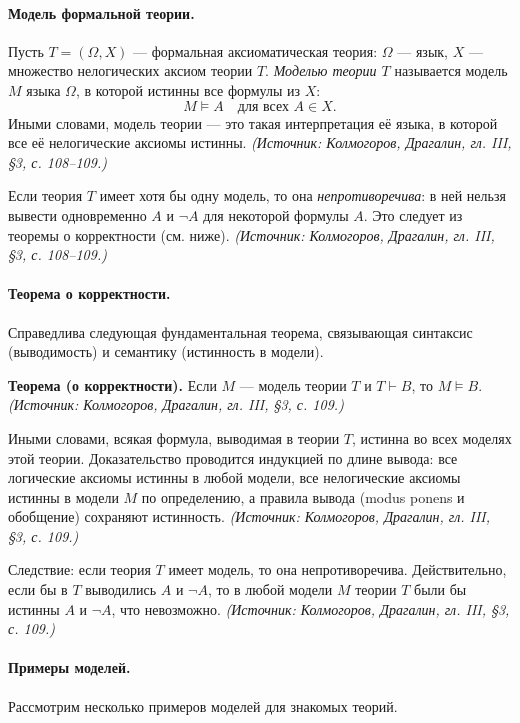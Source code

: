 \documentclass[a4paper,12pt]{article}
\begin{document}
\paragraph{Модель формальной теории.} Пусть \(T=(\Omega,X)\) --- формальная аксиоматическая теория: \(\Omega\) --- язык, \(X\) --- множество нелогических аксиом теории \(T\). \emph{Моделью теории \(T\)} называется модель \(M\) языка \(\Omega\), в которой истинны все формулы из \(X\):
\[
M\models A\quad\text{для всех }A\in X.
\]
Иными словами, модель теории --- это такая интерпретация её языка, в которой все её нелогические аксиомы истинны.
\textit{(Источник: Колмогоров, Драгалин, гл. III, §3, с. 108--109.)}

Если теория \(T\) имеет хотя бы одну модель, то она \emph{непротиворечива}: в ней нельзя вывести одновременно \(A\) и \(\neg A\) для некоторой формулы \(A\). Это следует из теоремы о корректности (см. ниже).
\textit{(Источник: Колмогоров, Драгалин, гл. III, §3, с. 108--109.)}

\paragraph{Теорема о корректности.} Справедлива следующая фундаментальная теорема, связывающая синтаксис (выводимость) и семантику (истинность в модели).

\textbf{Теорема (о корректности).} Если \(M\) --- модель теории \(T\) и \(T\vdash B\), то \(M\models B\).
\textit{(Источник: Колмогоров, Драгалин, гл. III, §3, с. 109.)}

Иными словами, всякая формула, выводимая в теории \(T\), истинна во всех моделях этой теории. Доказательство проводится индукцией по длине вывода: все логические аксиомы истинны в любой модели, все нелогические аксиомы истинны в модели \(M\) по определению, а правила вывода (modus ponens и обобщение) сохраняют истинность.
\textit{(Источник: Колмогоров, Драгалин, гл. III, §3, с. 109.)}

Следствие: если теория \(T\) имеет модель, то она непротиворечива. Действительно, если бы в \(T\) выводились \(A\) и \(\neg A\), то в любой модели \(M\) теории \(T\) были бы истинны \(A\) и \(\neg A\), что невозможно.
\textit{(Источник: Колмогоров, Драгалин, гл. III, §3, с. 109.)}

\paragraph{Примеры моделей.} Рассмотрим несколько примеров моделей для знакомых теорий.
\end{document}
